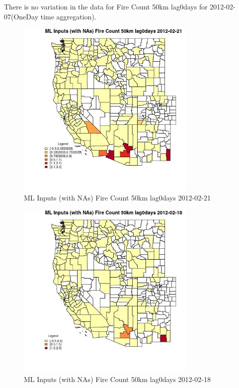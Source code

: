 There is no variation in the data for Fire Count 50km lag0days for 2012-02-07(OneDay time aggregation). 
 

\begin{figure} 
\centering  
\includegraphics[width=0.77\textwidth]{Code_Outputs/Report_ML_input_PM25_Step4_part_f_de_duplicated_aves_prioritize_24hr_obswNAs_CountyFire_Count_50km_lag0daysMean2012-02-21.jpg} 
\caption{\label{fig:Report_ML_input_PM25_Step4_part_f_de_duplicated_aves_prioritize_24hr_obswNAsCountyFire_Count_50km_lag0daysMean2012-02-21}ML Inputs (with NAs) Fire Count 50km lag0days 2012-02-21} 
\end{figure} 
 

\begin{figure} 
\centering  
\includegraphics[width=0.77\textwidth]{Code_Outputs/Report_ML_input_PM25_Step4_part_f_de_duplicated_aves_prioritize_24hr_obswNAs_CountyFire_Count_50km_lag0daysMean2012-02-18.jpg} 
\caption{\label{fig:Report_ML_input_PM25_Step4_part_f_de_duplicated_aves_prioritize_24hr_obswNAsCountyFire_Count_50km_lag0daysMean2012-02-18}ML Inputs (with NAs) Fire Count 50km lag0days 2012-02-18} 
\end{figure} 
 

